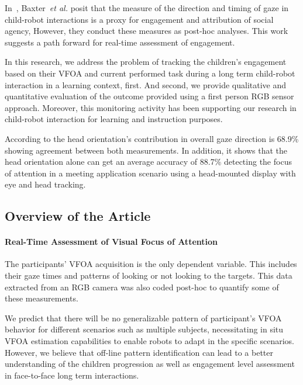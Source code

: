 \documentclass{sig-alternate}
\newcommand{\etal}{\textit{et al.}\xspace}
\begin{document}
In~\cite{baxter2014tracking}, Baxter~\etal posit that the measure of the
direction and timing of gaze in child-robot interactions is a proxy for
engagement and attribution of social agency, However, they conduct these
measures as post-hoc analyses. This work suggests a path forward for real-time
assessment of engagement.

In this research, we address the problem of tracking the children's engagement
based on their VFOA and current performed task during a long term child-robot
interaction in a learning context, first. And second, we provide qualitative and
quantitative evaluation of the outcome provided using a first person RGB sensor
approach. Moreover, this monitoring activity has been supporting our research in
child-robot interaction for learning and instruction purposes.


According to \cite{stiefelhagen2002tracking} the head orientation's contribution
in overall gaze direction is 68.9\% showing agreement between both measurements.
In addition, it shows that the head orientation alone can get an average
accuracy of 88.7\% detecting the focus of attention in a meeting application
scenario using a head-mounted display with eye and head tracking.


\subsection*{Overview of the Article}

\paragraph{Real-Time Assessment of Visual Focus of Attention}
The participants' VFOA acquisition is the only dependent variable. This includes
their gaze times and patterns of looking or not looking to the targets. This
data extracted from an RGB camera was also coded post-hoc to quantify some of
these measurements.

We predict that there will be no generalizable pattern of participant's VFOA
behavior for different scenarios such as multiple subjects, necessitating in
situ VFOA estimation capabilities to enable robots to adapt in the specific
scenarios. However, we believe that off-line pattern identification can lead to
a better understanding of the children progression as well as engagement level
assessment in face-to-face long term interactions.
\end{document}
